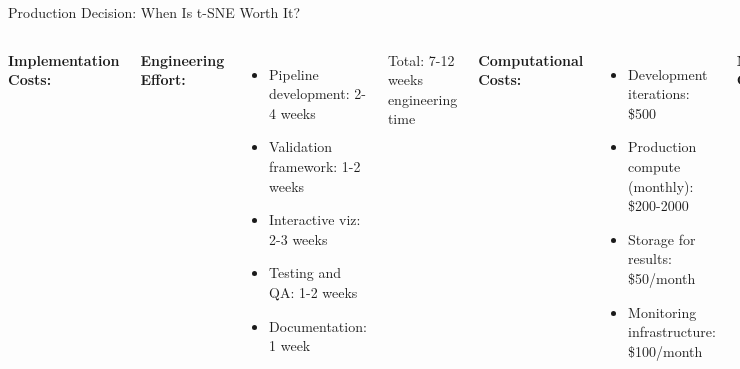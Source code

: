 \documentclass[aspectratio=169]{beamer}
\begin{document}
\begin{frame}{Production Decision: When Is t-SNE Worth It?}
\begin{columns}
\textbf{Implementation Costs:}

\textbf{Engineering Effort:}
\begin{itemize}
\item Pipeline development: 2-4 weeks
\item Validation framework: 1-2 weeks
\item Interactive viz: 2-3 weeks
\item Testing and QA: 1-2 weeks
\item Documentation: 1 week
\end{itemize}

Total: 7-12 weeks engineering time

\textbf{Computational Costs:}
\begin{itemize}
\item Development iterations: \$500
\item Production compute (monthly): \$200-2000
\item Storage for results: \$50/month
\item Monitoring infrastructure: \$100/month
\end{itemize}

\textbf{Maintenance Costs:}
\begin{itemize}
\item Algorithm updates: 2 days/quarter
\item Bug fixes and improvements: 1 day/month
\item User support: 4 hours/week
\end{itemize}

\textbf{Expected Benefits:}

\textbf{Quantifiable:}
\begin{itemize}
\item Time to insight: -40\% (2h → 1.2h)
\item Patterns discovered: +60\%
\item False positive rate: -25\%
\item Decision accuracy: +15\%
\end{itemize}

\textbf{ROI Calculation:}

Assume 10 analysts, \$100K/year each:
\begin{itemize}
\item Cost of 40\% time savings: \$400K/year
\item Better decisions value: \$200K/year
\item Total annual benefit: \$600K
\item Implementation cost: \$150K
\item Annual operating cost: \$30K
\end{itemize}


\end{columns}
\end{frame}
\end{document}

